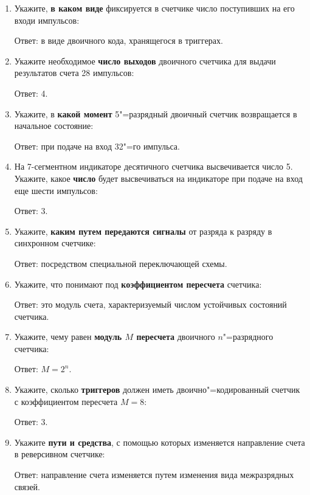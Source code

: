 \documentclass[spec, och, labwork]{shiza}
\begin{document}
\begin{enumerate}
    \item
        Укажите, \textbf{в каком виде} фиксируется в счетчике число
        поступивших на его входи импульсов:

        Ответ: в виде двоичного кода, хранящегося в триггерах.
    
    \item
        Укажите необходимое \textbf{число выходов} двоичного счетчика
        для выдачи результатов счета 28 импульсов:

        Ответ: 4.

    \item
        Укажите, в \textbf{какой момент} 5"=разрядный двоичный счетчик
        возвращается в начальное состояние:

        Ответ: при подаче на вход 32"=го импульса.

    \item
        На 7-сегментном индикаторе десятичного счетчика высвечивается
        число 5. Укажите, какое \textbf{число} будет высвечиваться на индикаторе
        при подаче на вход еще шести импульсов:

        Ответ: 3.
    
    \item
        Укажите, \textbf{каким путем передаются сигналы} от разряда к
        разряду в синхронном счетчике:

        Ответ: посредством специальной переключающей схемы.

    \item
        Укажите, что понимают под \textbf{коэффициентом пересчета}
        счетчика:

        Ответ: это модуль счета, характеризуемый числом устойчивых состояний счетчика.

    \item
        Укажите, чему равен \textbf{модуль $M$ пересчета} двоичного 
        $n$"=разрядного счетчика:

        Ответ: $M = 2^n$.

    \item
        Укажите, сколько \textbf{триггеров} должен иметь 
        двоично"=кодированный счетчик с коэффициентом пересчета $M = 8$:

        Ответ: 3.
    
    \item
        Укажите \textbf{пути и средства}, с помощью которых изменяется
        направление счета в реверсивном счетчике:
        
        Ответ: направление счета изменяется путем изменения вида межразрядных связей.
\end{enumerate}
\end{document}

